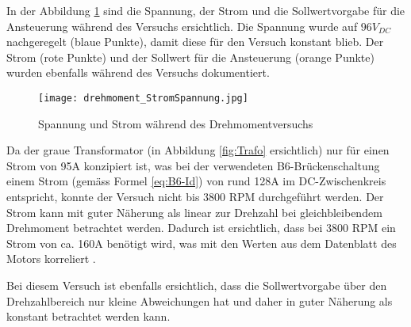 In der Abbildung \ref{fig:drehmoment/StromSpannung} sind die Spannung, der Strom und die Sollwertvorgabe für die Ansteuerung während des Versuchs ersichtlich. Die Spannung wurde auf $96V_{DC}$ nachgeregelt (blaue Punkte), damit diese für den Versuch konstant blieb. Der Strom (rote Punkte) und der Sollwert für die Ansteuerung (orange Punkte) wurden ebenfalls während des Versuchs dokumentiert.


\begin{figure}[H]
	\centering
	\texttt{[image: drehmoment\_StromSpannung.jpg]}
	\caption{Spannung und Strom während des Drehmomentversuchs}\label{fig:drehmoment/StromSpannung}
\end{figure}

Da der graue Transformator (in Abbildung \ref{fig:Trafo} ersichtlich) nur für einen Strom von 95A konzipiert ist, was bei der verwendeten B6-Brückenschaltung einem Strom (gemäss Formel \ref{eq:B6-Id}) von rund 128A im DC-Zwischenkreis entspricht, konnte der Versuch nicht bis 3800 RPM durchgeführt werden. Der Strom kann mit guter Näherung als linear zur Drehzahl bei gleichbleibendem Drehmoment betrachtet werden. Dadurch ist ersichtlich, dass bei 3800 RPM ein Strom von ca. 160A benötigt wird, was mit den Werten aus dem Datenblatt des Motors korreliert \cite{MotorData}.

Bei diesem Versuch ist ebenfalls ersichtlich, dass die Sollwertvorgabe über den Drehzahlbereich nur kleine Abweichungen hat und daher in guter Näherung als konstant betrachtet werden kann.
